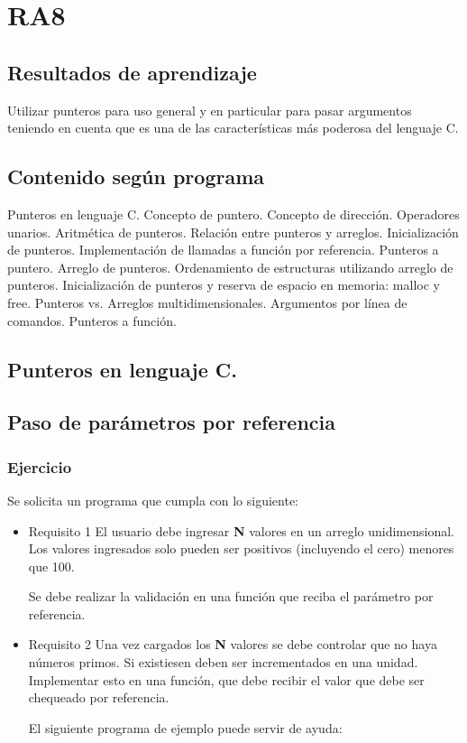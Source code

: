 \section{RA8}
\subsection*{Resultados de aprendizaje}
Utilizar punteros para uso general y en particular para pasar argumentos teniendo en cuenta que es una de las características más poderosa del lenguaje C.

\subsection*{Contenido según programa}
Punteros en lenguaje C.  Concepto de puntero.  Concepto de dirección.  Operadores unarios.  Aritmética de punteros.  Relación entre punteros y arreglos. Inicialización de punteros. Implementación de llamadas a función por referencia. Punteros a puntero. Arreglo de punteros. Ordenamiento de estructuras utilizando arreglo de punteros.  Inicialización de punteros y reserva de espacio en memoria: malloc y free.  Punteros vs. Arreglos multidimensionales.  Argumentos por línea de comandos. Punteros a función.

\setcounter{subsection}{8}
\subsection*{Punteros en lenguaje C.}

\subsection*{Paso de parámetros por referencia}
\subsubsection{Ejercicio}
Se solicita un programa que cumpla con lo siguiente:
\begin{itemize}[a)]
  \item Requisito 1
    El usuario debe ingresar \textbf{N} valores en un arreglo unidimensional. Los valores ingresados solo pueden ser positivos (incluyendo el cero) menores que 100.

    Se debe realizar la validación en una función que reciba el parámetro por referencia.

  \item Requisito 2
    Una vez cargados los \textbf{N} valores se debe controlar que no haya números primos. Si existiesen deben ser incrementados en una unidad. Implementar esto en una función,
    que debe recibir el valor que debe ser chequeado por referencia.

    El siguiente programa de ejemplo puede servir de ayuda:

    \lstset{inputencoding=utf8/latin1}
    
\end{itemize}

